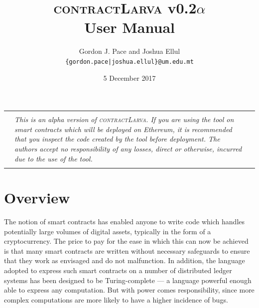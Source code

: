 \documentclass{article}
\newcommand{\contractlarva}{\textsc{contractLarva}\xspace}
\begin{document}
\title{\contractlarva v0.2$\alpha$\\User Manual}
\author{Gordon J. Pace and Joshua Ellul\\\texttt{\{gordon.pace|joshua.ellul\}@um.edu.mt}}
\date{5 December 2017}
\maketitle


\begin{center}
  \begin{tabular}{|lll|}\hline\qquad&&\qquad\\
    &\begin{minipage}{0.8\textwidth}
      \emph{This is an alpha version of \contractlarva. If you are using the tool on smart contracts which will be deployed on Ethereum, it is recommended that you inspect the code created by the tool before deployment. The authors accept no responsibility of any losses, direct or otherwise, incurred due to the use of the tool.}
    \end{minipage}&\\&&\\
  \hline\end{tabular} 
\end{center}



  \section{Overview}
  
  The notion of smart contracts has enabled anyone to write code which handles potentially large volumes of digital assets, typically in the form of a cryptocurrency. The price to pay for the ease in which this can now be achieved is that many smart contracts are written without necessary safeguards to ensure that they work as envisaged and do not  malfunction. In addition, the language adopted to express such smart contracts on a number of distributed ledger systems has been designed to be Turing-complete --- a language powerful enough able to express any computation. But with power comes responsibility, since more complex computations are more likely to have a higher incidence of bugs. 
\end{document}
